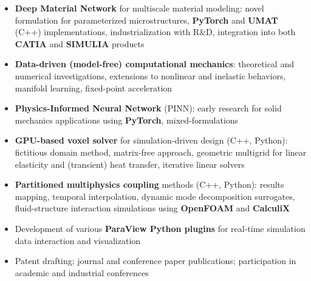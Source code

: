 \documentclass[10pt,a4paper,ragged2e,withhyper]{altacv}
\begin{document}
\begin{paracol}{2}

  \begin{itemize}
    \item \textbf{Deep Material Network} for multiscale material modeling: novel formulation for parameterized microstructures, \textbf{PyTorch} and \textbf{UMAT} (C++) implementations, industrialization with R\&D, integration into both \textbf{CATIA} and \textbf{SIMULIA} products
    \item \textbf{Data-driven (model-free) computational mechanics}: theoretical and numerical investigations, extensions to nonlinear and inelastic behaviors, manifold learning, fixed-point acceleration
    \item \textbf{Physics-Informed Neural Network} (PINN): early research for solid mechanics applications using \textbf{PyTorch}, mixed-formulations
    \item \textbf{GPU-based voxel solver} for simulation-driven design (C++, Python): fictitious domain method, matrix-free approach, geometric multigrid for linear elasticity and (transient) heat transfer, iterative linear solvers
    \item \textbf{Partitioned multiphysics coupling} methods (C++, Python): results mapping, temporal interpolation, dynamic mode decomposition surrogates, fluid-structure interaction simulations using \textbf{OpenFOAM} and \textbf{CalculiX}
    \item Development of various \textbf{ParaView Python plugins} for real-time simulation data interaction and visualization
    \item Patent drafting; journal and conference paper publications; participation in academic and industrial conferences
  \end{itemize}

  \divider


\end{paracol}
\end{document}
